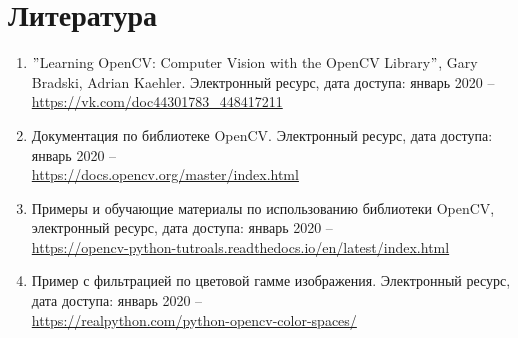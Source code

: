 \section{Литература}

\begin{enumerate}
	\item $"$Learning OpenCV: Computer Vision with the OpenCV Library$"$, Gary Bradski, Adrian Kaehler. Электронный ресурс, дата доступа: январь 2020 -- \\\href{https://vk.com/doc44301783_448417211}{https://vk.com/doc44301783\_448417211}
	\protect
	\item Документация по библиотеке OpenCV. Электронный ресурс, дата доступа: январь 2020 --\\ \href{https://docs.opencv.org/master/index.html}{https://docs.opencv.org/master/index.html}
	\protect
	\item Примеры и обучающие материалы по использованию библиотеки OpenCV, электронный ресурс, дата доступа: январь 2020 --\\ \href{https://opencv-python-tutroals.readthedocs.io/en/latest/index.html}{https://opencv-python-tutroals.readthedocs.io/en/latest/index.html}
	\protect
	\item Пример с фильтрацией по цветовой гамме изображения. Электронный ресурс, дата доступа: январь 2020 --\\
	\href{https://realpython.com/python-opencv-color-spaces/}{https://realpython.com/python-opencv-color-spaces/}
	\protect
\end{enumerate}
